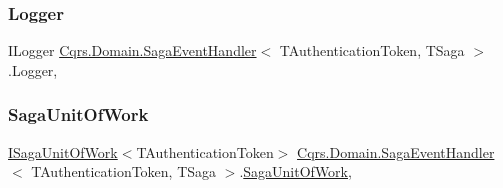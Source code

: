 \subsubsection{\texorpdfstring{Logger}{Logger}}
{\footnotesize\ttfamily I\+Logger \hyperlink{classCqrs_1_1Domain_1_1SagaEventHandler}{Cqrs.\+Domain.\+Saga\+Event\+Handler}$<$ T\+Authentication\+Token, T\+Saga $>$.Logger\hspace{0.3cm}{\ttfamily [get]}, {\ttfamily [protected]}}

\mbox{\label{classCqrs_1_1Domain_1_1SagaEventHandler_a4cab45aafb7b71534aae7cbe077d1129_a4cab45aafb7b71534aae7cbe077d1129}} 
\subsubsection{\texorpdfstring{Saga\+Unit\+Of\+Work}{SagaUnitOfWork}}
{\footnotesize\ttfamily \hyperlink{interfaceCqrs_1_1Domain_1_1ISagaUnitOfWork}{I\+Saga\+Unit\+Of\+Work}$<$T\+Authentication\+Token$>$ \hyperlink{classCqrs_1_1Domain_1_1SagaEventHandler}{Cqrs.\+Domain.\+Saga\+Event\+Handler}$<$ T\+Authentication\+Token, T\+Saga $>$.\hyperlink{classCqrs_1_1Domain_1_1SagaUnitOfWork}{Saga\+Unit\+Of\+Work}\hspace{0.3cm}{\ttfamily [get]}, {\ttfamily [protected]}}

